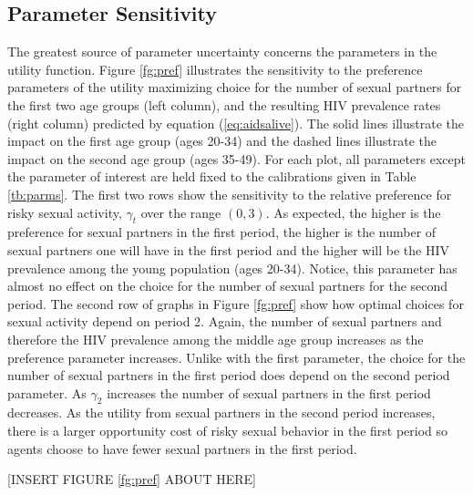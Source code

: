\documentclass[12pt]{article}
\begin{document}
\subsection{Parameter Sensitivity}
The greatest source of parameter uncertainty concerns the parameters in the utility function.  Figure \ref{fg:pref} illustrates the sensitivity to the preference parameters of the utility maximizing choice for the number of sexual partners for the first two age groups (left column), and the resulting HIV prevalence rates (right column) predicted by equation (\ref{eq:aidsalive}).  The solid lines illustrate the impact on the first age group (ages 20-34) and the dashed lines illustrate the impact on the second age group (ages 35-49).  For each plot, all parameters except the parameter of interest are held fixed to the calibrations given in Table \ref{tb:parms}.  The first two rows show the sensitivity to the relative preference for risky sexual activity, $\gamma_t$ over the range $(0,3)$.  As expected, the higher is the preference for sexual partners in the first period, the higher is the number of sexual partners one will have in the first period and the higher will be the HIV prevalence among the young population (ages 20-34).  Notice, this parameter has almost no effect on the choice for the number of sexual partners for the second period.  The second row of graphs in Figure \ref{fg:pref} show how optimal choices for sexual activity depend on period 2.  Again, the number of sexual partners and therefore the HIV prevalence among the middle age group increases as the preference parameter increases.  Unlike with the first parameter, the choice for the number of sexual partners in the first period does depend on the second period parameter.  As $\gamma_2$ increases the number of sexual partners in the first period decreases.  As the utility from sexual partners in the second period increases, there is a larger opportunity cost of risky sexual behavior in the first period so agents choose to have fewer sexual partners in the first period.

\begin{center}[INSERT FIGURE \ref{fg:pref} ABOUT HERE]\end{center}
\end{document}
